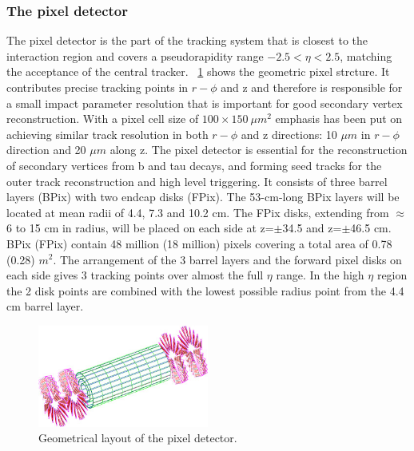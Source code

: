 \subsubsection{The pixel detector}
The pixel detector is the part of the tracking system that is closest to the interaction region and covers a pseudorapidity range $-2.5 < \eta  < 2.5$, matching the acceptance of the central tracker. \figurename~\ref{Pixel_structure} shows the geometric pixel strcture. It contributes precise tracking points in $r - \phi$ and z and therefore is responsible for a small impact parameter resolution that is important for good secondary vertex reconstruction. With a pixel cell size of $100 \times 150\ \mu m^{2}$ emphasis has been put on achieving similar track resolution in both $r-\phi$ and z directions: 10 $\mu m$ in $r - \phi$ direction and 20 $\mu m$ along z. The pixel detector is essential for the reconstruction of secondary vertices from b and tau decays, and forming seed tracks for the outer track reconstruction and high level triggering. It consists of three barrel layers (BPix) with two endcap disks (FPix). The 53-cm-long BPix layers will be located at mean radii of 4.4, 7.3 and 10.2 cm. The FPix disks, extending from $\approx$ 6 to 15 cm in radius, will be placed on each side at z=$\pm$34.5 and z=$\pm$46.5 cm. BPix (FPix) contain 48 million (18 million) pixels covering a total area of 0.78 (0.28) $m^{2}$. The arrangement of the 3 barrel layers and the forward pixel disks on each side gives 3 tracking points over almost the full $\eta$ range. In the high $\eta$ region the 2 disk points are combined with the lowest possible radius point from the 4.4 cm barrel layer.
\begin{figure}[htbp]
\centering
\includegraphics[width=0.5\textwidth]{Images/Pixel_structure}
\caption{Geometrical layout of the pixel detector.}
\label{Pixel_structure}
\end{figure}

